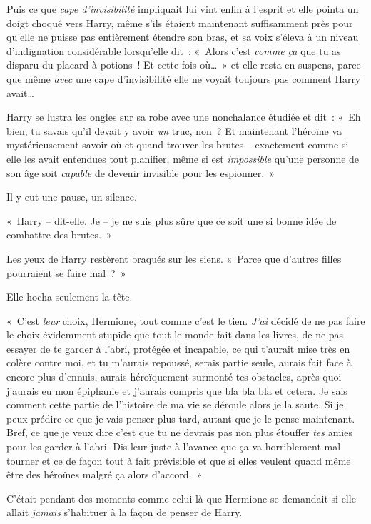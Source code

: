 Puis ce que \emph{cape d'invisibilité} impliquait lui vint enfin à l'esprit et elle pointa un doigt choqué vers Harry, même s'ils étaient maintenant suffisamment près pour qu'elle ne puisse pas entièrement étendre son bras, et sa voix s'éleva à un niveau d'indignation considérable lorsqu'elle dit~: «~Alors c'est \emph{comme ça} que tu as disparu du placard à potions~! Et cette fois où…~» et elle resta en suspens, parce que même \emph{avec} une cape d'invisibilité elle ne voyait toujours pas comment Harry avait…

Harry se lustra les ongles sur sa robe avec une nonchalance étudiée et dit~: «~Eh bien, tu savais qu'il devait y avoir \emph{un} truc, non~? Et maintenant l'héroïne va mystérieusement savoir où et quand trouver les brutes -- exactement comme si elle les avait entendues tout planifier, même si est \emph{impossible} qu'une personne de son âge soit \emph{capable} de devenir invisible pour les espionner.~»

Il y eut une pause, un silence.

«~Harry -- dit-elle. Je -- je ne suis plus sûre que ce soit une si bonne idée de combattre des brutes.~»

Les yeux de Harry restèrent braqués sur les siens. «~Parce que d'autres filles pourraient se faire mal~?~»

Elle hocha seulement la tête.

«~C'est \emph{leur} choix, Hermione, tout comme c'est le tien. \emph{J'ai} décidé de ne pas faire le choix évidemment stupide que tout le monde fait dans les livres, de ne pas essayer de te garder à l'abri, protégée et incapable, ce qui t'aurait mise très en colère contre moi, et tu m'aurais repoussé, serais partie seule, aurais fait face à encore plus d'ennuis, aurais héroïquement surmonté tes obstacles, après quoi j'aurais eu mon épiphanie et j'aurais compris que bla bla bla et cetera. Je sais comment cette partie de l'histoire de ma vie se déroule alors je la saute. Si je peux prédire ce que je vais penser plus tard, autant que je le pense maintenant. Bref, ce que je veux dire c'est que tu ne devrais pas non plus étouffer \emph{tes} amies pour les garder à l'abri. Dis leur juste à l'avance que ça va horriblement mal tourner et ce de façon tout à fait prévisible et que si elles veulent quand même être des héroïnes malgré ça alors d'accord.~»

C'était pendant des moments comme celui-là que Hermione se demandait si elle allait \emph{jamais} s'habituer à la façon de penser de Harry.

